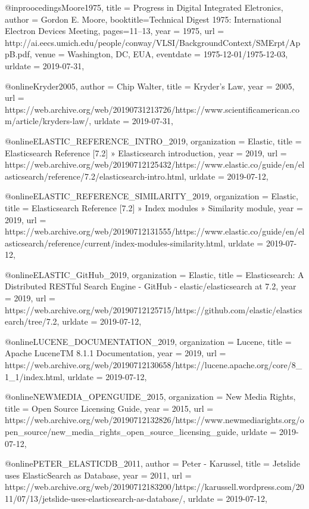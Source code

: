 {@inproocedings{Moore1975,
  title = {{P}rogress in {D}igital {I}ntegrated {E}letronics},
  author = {Gordon E. Moore},
  booktitle={Technical Digest 1975: International Electron Devices Meeting},
  pages={11--13},
  year = {1975},
  url = {http://ai.eecs.umich.edu/people/conway/VLSI/BackgroundContext/SMErpt/AppB.pdf},
  venue        = {Washington, DC, EUA},
  eventdate    = {1975-12-01/1975-12-03},
  urldate = {2019-07-31},
}

@online{Kryder2005,
  author = {Chip Walter},
  title = {Kryder's Law},
  year = {2005},
  url = {https://web.archive.org/web/20190731213726/https://www.scientificamerican.com/article/kryders-law/},
  urldate = {2019-07-31},
}

@online{ELASTIC_REFERENCE_INTRO_2019,
  organization = {Elastic},
  title = {Elasticsearch Reference [7.2] » Elasticsearch introduction},
  year = {2019},
  url = {https://web.archive.org/web/20190712125432/https://www.elastic.co/guide/en/elasticsearch/reference/7.2/elasticsearch-intro.html},
  urldate = {2019-07-12},
}

@online{ELASTIC_REFERENCE_SIMILARITY_2019,
  organization = {Elastic},
  title = {Elasticsearch Reference [7.2] » Index modules » Similarity module},
  year = {2019},
  url = {https://web.archive.org/web/20190712131555/https://www.elastic.co/guide/en/elasticsearch/reference/current/index-modules-similarity.html},
  urldate = {2019-07-12},
}

@online{ELASTIC_GitHub_2019,
  organization = {Elastic},
  title = {Elasticsearch: A Distributed RESTful Search Engine - GitHub - elastic/elasticsearch at 7.2},
  year = {2019},
  url = {https://web.archive.org/web/20190712125715/https://github.com/elastic/elasticsearch/tree/7.2},
  urldate = {2019-07-12},
}

@online{LUCENE_DOCUMENTATION_2019,
  organization = {Lucene},
  title = {Apache LuceneTM 8.1.1 Documentation},
  year = {2019},
  url = {https://web.archive.org/web/20190712130658/https://lucene.apache.org/core/8_1_1/index.html},
  urldate = {2019-07-12},
}

@online{NEWMEDIA_OPENGUIDE_2015,
  organization = {New Media Rights},
  title = {Open Source Licensing Guide},
  year = {2015},
  url = {https://web.archive.org/web/20190712132826/https://www.newmediarights.org/open_source/new_media_rights_open_source_licensing_guide},
  urldate = {2019-07-12},
}

@online{PETER_ELASTICDB_2011,
  author = {{Peter - Karussel}},
  title = {Jetslide uses ElasticSearch as Database},
  year = {2011},
  url = {https://web.archive.org/web/20190712183200/https://karussell.wordpress.com/2011/07/13/jetslide-uses-elasticsearch-as-database/},
  urldate = {2019-07-12},
}

}

